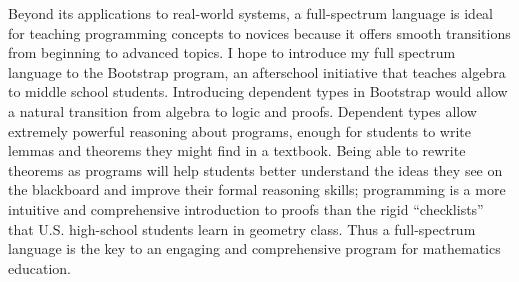 \documentclass[12pt]{article}
\begin{document}
Beyond its applications to real-world systems, a full-spectrum language is ideal for teaching programming concepts to novices because it offers smooth transitions from beginning to advanced topics.
I hope to introduce my full spectrum language to the Bootstrap program, an afterschool initiative that teaches algebra to middle school students.
Introducing dependent types in Bootstrap would allow a natural transition from algebra to logic and proofs.
Dependent types allow extremely powerful reasoning about programs, enough for students to write lemmas and theorems they might find in a textbook.
Being able to rewrite theorems as programs will help students better understand the ideas they see on the blackboard and improve their formal reasoning skills; programming is a more intuitive and comprehensive introduction to proofs than the rigid ``checklists'' that U.S. high-school students learn in geometry class.
Thus a full-spectrum language is the key to an engaging and comprehensive program for mathematics education.

\vfill{}
\renewcommand{\section}[2]{}
\begin{multicols}{2}
\footnotesize


\end{multicols}
\end{document}
